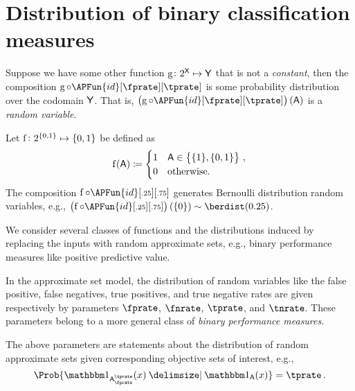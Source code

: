 \documentclass[ ../main.tex]{subfiles}
\begin{document}
\section{Distribution of binary classification measures}
\label{sec:perf}
Suppose we have some other function $\Fun{g} \colon \PS{\Set{X}} \mapsto \Set{Y}$ that is not a \emph{constant}, then the composition $\Fun{g} \circ \APFun{id}[\fprate][\tprate]$ is some probability distribution over the codomain $\Set{Y}$.
That is, $\left(\Fun{g} \circ \APFun{id}[\fprate][\tprate]\right)(\Set{A})$ is a \emph{random variable}.
\begin{example}
Let $\Fun{f} \colon \PS{\{0,1\}} \mapsto \{0,1\}$ be defined as
\begin{equation}
\Fun{f}(\Set{A}) \coloneqq
\begin{cases}
	1 & \Set{A} \in \left\{\{1\},\{0,1\}\right\}\,,\\
	0 & \text{otherwise.}
\end{cases}
\end{equation}
The composition $\Fun{f} \circ \APFun{id}[\mathsmaller{.25}][\mathsmaller{.75}]$ generates Bernoulli distribution random variables, e.g., $\left(\Fun{f} \circ \APFun{id}[\mathsmaller{.25}][\mathsmaller{.75}]\right)(\{0\}) \sim \berdist(0.25)$.
\end{example}

We consider several classes of functions and the distributions induced by replacing the inputs with random approximate sets, e.g., binary performance measures like positive predictive value.


In the approximate set model, the distribution of random variables like the false positive, false negatives, true positives, and true negative rates are given respectively by parameters $\fprate$, $\fnrate$, $\tprate$, and $\tnrate$.
These parameters belong to a more general class of \emph{binary performance measures}.

The above parameters are statements about the distribution of random approximate sets given corresponding objective sets of interest, e.g.,
\begin{equation}
\Prob{\SetIndicator{\ASet{A}[\fprate][\tprate]}(x) \Given 
	\SetIndicator{\Set{A}}(x)} = \tprate\,.
\end{equation}
\end{document}
